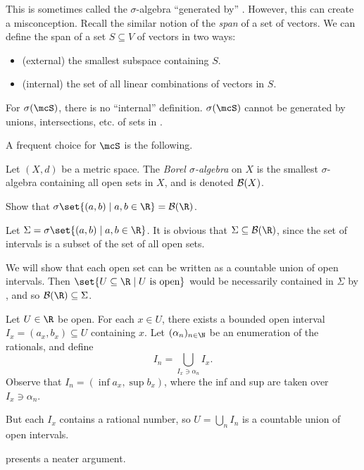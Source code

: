 This is sometimes called the $\sigma$-algebra ``generated by'' \mcS.
However, this can create a misconception.
Recall the similar notion of the \emph{span} of a set of vectors.
We can define the span of a set $S \subseteq V$ of vectors in two ways:
\begin{itemize}
    \item (external) the smallest subspace containing $S$.
    \item (internal) the set of all linear combinations of vectors in $S$.
\end{itemize}
For $\sigma(\mcS)$, there is no ``internal'' definition.
$\sigma(\mcS)$ cannot be generated by unions, intersections, etc. of sets in
\mcS.

A frequent choice for $\mcS$ is the following.
\begin{definition*} \label{def:borel}
    Let $(X, d)$ be a metric space.
    The \emph{Borel $\sigma$-algebra} on $X$ is the smallest
    $\sigma$-algebra containing all open sets in $X$, and is denoted
    $\mathcal B(X)$.
\end{definition*}
\begin{exercise}[self] \label{thm:borel-R}
    Show that $\sigma\set{(a, b) \mid a, b \in \R} = \B(\R)$.
\end{exercise}
\begin{solution}
    Let $\Sigma = \sigma\set{(a, b) \mid a, b \in \R}$.
    It is obvious that $\Sigma \subseteq \B(\R)$, since the set of
    intervals is a subset of the set of all open sets.

    We will show that each open set can be written as a countable union
    of open intervals.
    Then $\set{U \subseteq \R \mid U \text{ is open}}$ would be
    necessarily contained in $\Sigma$ by ,
    and so $\B(\R) \subseteq \Sigma$.

    Let $U \in \R$ be open.
    For each $x \in U$, there exists a bounded open interval
    $I_x = (a_x, b_x) \subseteq U$ containing $x$.
    Let $(\alpha_n)_{n \in \N}$ be an enumeration of the rationals,
    and define \[
        I_n = \bigcup_{I_x \ni \alpha_n} I_x.
    \] Observe that $I_n = (\inf a_x, \sup b_x)$,
    where the inf and sup are taken over $I_x \ni \alpha_n$.

    But each $I_x$ contains a rational number,
    so $U = \bigcup_n I_n$ is a countable union of open intervals.
\end{solution}
 presents a neater argument.

